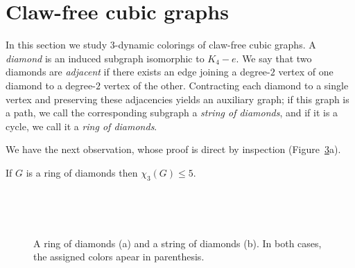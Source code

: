 \section{Claw-free cubic graphs}

In this section we study $3$-dynamic colorings of claw-free cubic graphs.
A \emph{diamond} is an induced subgraph isomorphic to $K_4 - e$. 
We say that two diamonds are \emph{adjacent} if there exists an edge joining a degree-$2$ vertex of one diamond to a degree-$2$ vertex of the other. 
Contracting each diamond to a single vertex and preserving these adjacencies yields an auxiliary graph; if this graph is a path, we call the corresponding subgraph a \emph{string of diamonds}, and if it is a cycle, we call it a \emph{ring of diamonds}.


We have the next observation, whose proof is direct by inspection
(Figure~\ref{fig:cubic-claw-free-ring-string}a).

\begin{observation}\label{obs:ringX3leq5}
    If $G$ is a ring of diamonds then $\chi_3(G) \leq 5$.
\end{observation}

\begin{figure}[H]
    \centering
    \setcounter{subfigure}{0}

    \begin{subfigure}[b]{0.48\textwidth}
        \centering
        
        \caption{$ $}
        \label{fig:cubic-claw-free-ring}
    \end{subfigure}
    \hfill
    \begin{subfigure}[b]{0.48\textwidth}
        \centering
        
        \caption{$ $}
        \label{fig:cubic-claw-free-string}
    \end{subfigure}

    \caption{A ring of diamonds (a) and a string of diamonds (b). In both cases, the assigned colors apear in parenthesis.}
    \label{fig:cubic-claw-free-ring-string}
\end{figure}

